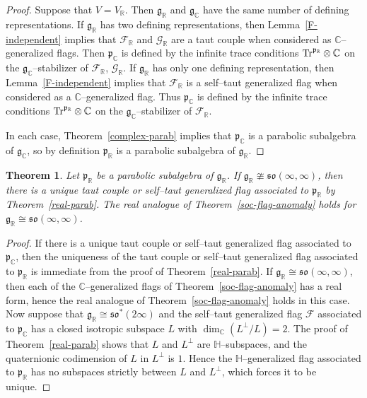 \documentclass[oneside,leqno,11pt]{article}
\def\gg{\mathfrak{g}}
\def\gp{\mathfrak{p}}
\def\gso{\mathfrak{so}}
\def\Tr{{\rm Tr}}
\def\C{\mathbb{C}}
\def\H{\mathbb{H}}
\def\R{\mathbb{R}}
\def\cF{\mathcal{F}}
\def\cG{\mathcal{G}}
\newtheorem{theorem}[equation]{Theorem}
\begin{document}
\begin{proof}
Suppose that $V = V_\R$.  Then $\gg_\R$ and $\gg_\C$ have the same number of defining representations.  If $\gg_\R$ has two defining representations, then Lemma~\ref{F-independent} implies that $\cF_\R$ and $\cG_\R$ are a taut couple when considered as $\C$--generalized flags.  Then $\gp_\C$ is defined by the infinite trace conditions $\Tr^{\gp_\R} \otimes \C$ on the $\gg_\C$--stabilizer of $\cF_\R$, $\cG_\R$.
If $\gg_\R$ has only one defining representation, then Lemma~\ref{F-independent} implies that $\cF_\R$ is a self--taut generalized flag when considered as a $\C$--generalized flag.  Thus $\gp_\C$ is 
defined by the infinite trace conditions $\Tr^{\gp_\R} \otimes \C$ on the $\gg_\C$--stabilizer of $\cF_\R$.

In each case, Theorem~\ref{complex-parab} implies that $\gp_\C$ is a parabolic subalgebra of $\gg_\C$, so by definition $\gp_\R$ is a parabolic subalgebra of $\gg_\R$.  
\end{proof}


\begin{theorem}
Let $\gp_\R$ be a parabolic subalgebra of $\gg_\R$.  If $\gg_\R \ncong \gso(\infty,\infty)$, then there is a unique taut couple or self--taut generalized flag associated to $\gp_\R$ by {\rm Theorem~\ref{real-parab}}.  The real analogue of {\rm Theorem~\ref{soc-flag-anomaly}} holds for $\gg_\R \cong \gso(\infty,\infty)$.
\end{theorem}

\begin{proof}
If there is a unique taut couple or self--taut generalized flag associated to $\gp_\C$, then the uniqueness of the taut couple or self--taut generalized flag associated to $\gp_\R$ is immediate from the proof of Theorem~\ref{real-parab}.  If $\gg_\R \cong \gso(\infty,\infty)$, then each of the $\C$--generalized flags of Theorem~\ref{soc-flag-anomaly} has a real form, hence the real analogue of Theorem~\ref{soc-flag-anomaly} holds in this case.  Now suppose that $\gg_\R \cong \gso^*(2\infty)$ and the self--taut generalized flag $\cF$ associated to $\gp_\C$ has a closed isotropic subspace $L$ with $\dim_\C (L^\perp / L) =2$.  The proof of Theorem~\ref{real-parab} shows that $L$ and $L^\perp$ are $\H$--subspaces, and the quaternionic codimension of $L$ in $L^\perp$ is $1$.  Hence the $\H$--generalized flag associated to $\gp_\R$ has no subspaces strictly between $L$ and $L^\perp$, which forces it to be unique.
\end{proof}
\end{document}
